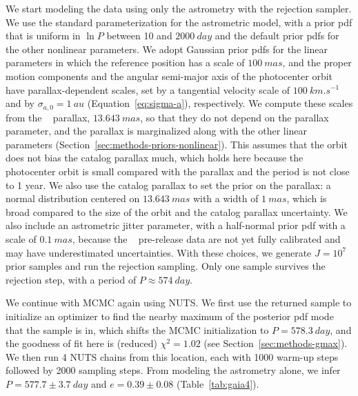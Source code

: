 \documentclass[twocolumn]{AASTeX7/aastex701}
\begin{document}
We start modeling the data using only the astrometry with the rejection sampler.
We use the standard parameterization for the astrometric model, with a prior pdf that
is uniform in $\ln P$ between 10 and $2000~\unit{day}$ and the default prior pdfs for
the other nonlinear parameters.
We adopt Gaussian prior pdfs for the linear parameters in which the reference position
has a scale of $100~\unit{mas}$, and the proper motion components and the angular
semi-major axis of the photocenter orbit have parallax-dependent scales, set by a
tangential velocity scale of $100~\unit{km.s^{-1}}$ and by $\sigma_{a,0} = 1~\unit{au}$
(Equation~\ref{eq:sigma-a}), respectively.
We compute these scales from the \gaia\  parallax, $13.643~\unit{mas}$, so that
they do not depend on the parallax parameter, and the parallax is marginalized along
with the other linear parameters (Section~\ref{sec:methods-priors-nonlinear}).
This assumes that the orbit does not bias the catalog parallax much, which holds here
because the photocenter orbit is small compared with the parallax and the period is not
close to 1 year.
We also use the catalog parallax to set the prior on the parallax: a normal distribution
centered on $13.643~\unit{mas}$ with a width of $1~\unit{mas}$, which is broad compared
to the size of the orbit and the catalog parallax uncertainty.
We also include an astrometric jitter parameter, with a half-normal prior pdf with a
scale of $0.1~\unit{mas}$, because the \gaia\  pre-release data are not yet fully
calibrated and may have underestimated uncertainties.
With these choices, we generate $J = 10^7$ prior samples and run the rejection sampling.
Only one sample survives the rejection step, with a period of $P \approx
574~\unit{day}$.

We continue with MCMC again using NUTS.
We first use the returned sample to initialize an optimizer to find the nearby maximum
of the posterior pdf mode that the sample is in, which shifts the MCMC initialization to
$P = 578.3~\unit{day}$, and the goodness of fit here is (reduced) $\chi^2 = 1.02$ (see
Section~\ref{sec:methods-gmax}).
We then run 4 NUTS chains from this location, each with 1000 warm-up steps followed by
2000 sampling steps.
From modeling the astrometry alone, we infer $P = 577.7 \pm 3.7~\unit{day}$ and $e =
0.39 \pm 0.08$ (Table~\ref{tab:gaia4}).
\end{document}
